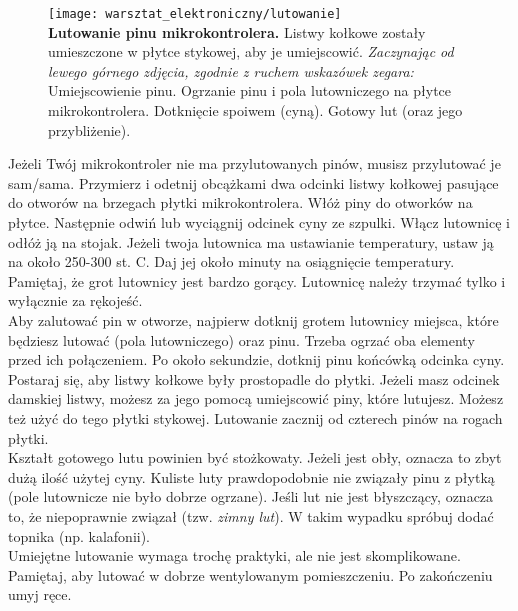 \documentclass{pdfBooklets}
\begin{document}
\begin{figure}[h!]\begin{Ramka}{}\begin{center}
  {\noindent\texttt{[image: warsztat\_elektroniczny/lutowanie]}}\\
  \small
  \textbf{Lutowanie pinu mikrokontrolera.} Listwy kołkowe zostały umieszczone w płytce stykowej, aby je umiejscowić. \textit{Zaczynając od lewego górnego zdjęcia,
    zgodnie z ruchem wskazówek zegara:} Umiejscowienie pinu. Ogrzanie pinu i pola lutowniczego na płytce mikrokontrolera.
  Dotknięcie spoiwem (cyną).
  Gotowy lut (oraz jego przybliżenie).
\end{center}\end{Ramka}\end{figure}

Jeżeli Twój mikrokontroler nie ma przylutowanych pinów, musisz przylutować je sam/sama. Przymierz i odetnij
obcążkami dwa odcinki listwy kołkowej pasujące do otworów na brzegach płytki mikrokontrolera. Włóż piny do otworków
na płytce. Następnie odwiń lub wyciągnij odcinek cyny ze szpulki. Włącz lutownicę i odłóż ją na stojak. Jeżeli twoja lutownica
ma ustawianie temperatury, ustaw ją na około 250-300 st. C. Daj jej około minuty na osiągnięcie temperatury. Pamiętaj, że grot
lutownicy jest bardzo gorący. Lutownicę należy trzymać tylko i wyłącznie za rękojeść.
\\

Aby zalutować pin w otworze, najpierw dotknij grotem lutownicy
miejsca, które będziesz lutować (pola lutowniczego) oraz pinu. Trzeba ogrzać oba elementy przed ich połączeniem. Po około sekundzie, dotknij pinu końcówką odcinka cyny.
\\

Postaraj się, aby listwy kołkowe były prostopadle do płytki. Jeżeli masz odcinek damskiej listwy, możesz za jego pomocą
umiejscowić piny, które lutujesz. Możesz też użyć do tego płytki stykowej. Lutowanie zacznij od czterech pinów na rogach płytki.
\\

Kształt gotowego lutu powinien być stożkowaty. Jeżeli jest obły, oznacza to zbyt dużą ilość użytej cyny. Kuliste luty prawdopodobnie nie związały pinu z płytką (pole lutownicze nie było dobrze ogrzane). Jeśli lut nie jest błyszczący, oznacza to, że niepoprawnie związał (tzw. \textit{zimny lut}). W takim wypadku spróbuj dodać
topnika (np. kalafonii).\\

Umiejętne lutowanie wymaga trochę praktyki, ale nie jest skomplikowane. Pamiętaj, aby lutować w dobrze wentylowanym
pomieszczeniu. Po zakończeniu umyj ręce.
\end{document}
